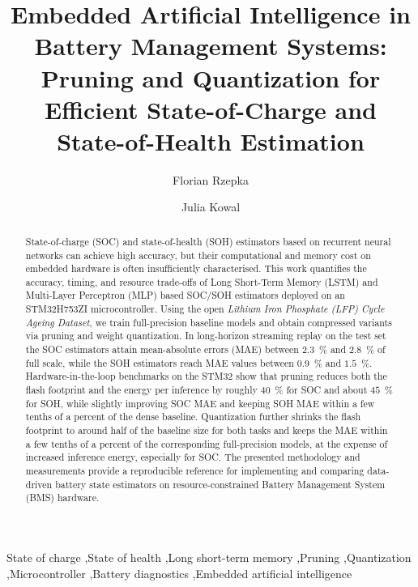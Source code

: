 \documentclass[final,3p,times]{elsarticle}
\date{}
\begin{document}
\begin{frontmatter}
\title{Embedded Artificial Intelligence in Battery Management Systems: Pruning and Quantization for Efficient State-of-Charge and State-of-Health Estimation}
\author[tu]{Florian Rzepka}
\author[tu]{Julia Kowal}
\begin{abstract}
State-of-charge (SOC) and state-of-health (SOH) estimators based on recurrent neural networks can achieve high accuracy, but their computational and memory cost on embedded hardware is often insufficiently characterised. This work quantifies the accuracy, timing, and resource trade-offs of Long Short-Term Memory (LSTM) and Multi-Layer Perceptron (MLP) based SOC/SOH estimators deployed on an STM32H753ZI microcontroller. Using the open \emph{Lithium Iron Phosphate (LFP) Cycle Ageing Dataset}, we train full-precision baseline models and obtain compressed variants via pruning and weight quantization. In long-horizon streaming replay on the test set the SOC estimators attain mean-absolute errors (MAE) between $2.3$~\% and $2.8$~\% of full scale, while the SOH estimators reach MAE values between $0.9$~\% and $1.5$~\%. Hardware-in-the-loop benchmarks on the STM32 show that pruning reduces both the flash footprint and the energy per inference by roughly $40$~\% for SOC and about $45$~\% for SOH, while slightly improving SOC MAE and keeping SOH MAE within a few tenths of a percent of the dense baseline. Quantization further shrinks the flash footprint to around half of the baseline size for both tasks and keeps the MAE within a few tenths of a percent of the corresponding full-precision models, at the expense of increased inference energy, especially for SOC. The presented methodology and measurements provide a reproducible reference for implementing and comparing data-driven battery state estimators on resource-constrained Battery Management System (BMS) hardware.
\end{abstract}
\begin{keyword}
State of charge \sep State of health \sep Long short-term memory \sep Pruning \sep Quantization \sep Microcontroller \sep Battery diagnostics \sep Embedded artificial intelligence
\end{keyword}
\end{frontmatter}
\end{document}
